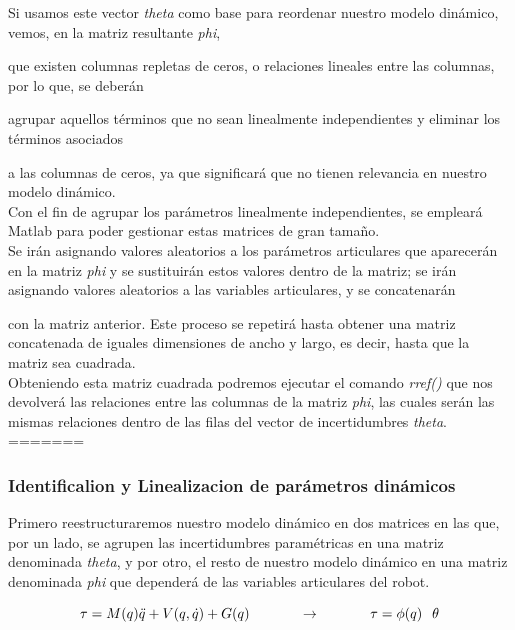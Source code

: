 Si usamos este vector \textit{theta} como base para reordenar nuestro modelo dinámico, vemos, en la matriz resultante \textit{phi},

que existen columnas repletas de ceros, o relaciones lineales entre las columnas, por lo que, se deberán

agrupar aquellos términos que no sean linealmente independientes y eliminar los términos asociados

a las columnas de ceros, ya que significará que no tienen relevancia en nuestro modelo dinámico.\\



Con el fin de agrupar los parámetros linealmente independientes, se empleará Matlab para poder gestionar estas matrices de gran tamaño.\\

Se irán asignando valores aleatorios a los parámetros articulares que aparecerán en la matriz \textit{phi} y se sustituirán estos valores dentro de la matriz; se irán asignando valores aleatorios a las variables articulares, y se concatenarán

con la matriz anterior. Este proceso se repetirá hasta obtener una matriz concatenada de iguales dimensiones de ancho y largo, es decir, hasta que la matriz sea cuadrada.\\



Obteniendo esta matriz cuadrada podremos ejecutar el comando \textit{rref()} que nos devolverá las relaciones entre las columnas de la matriz \textit{phi}, las cuales serán las mismas relaciones dentro de las filas del vector de incertidumbres \textit{theta}.\\


=======
	\subsubsection{Identificalion y Linealizacion de parámetros dinámicos}
		Primero reestructuraremos nuestro modelo dinámico en dos matrices en las que, por un lado,
		se agrupen las incertidumbres paramétricas en una matriz denominada \textit{theta}, y por otro, el resto de nuestro modelo
		dinámico en una matriz denominada \textit{phi} que dependerá de las variables articulares del robot.

		\begin{equation}
			\tau=M(q)\ddot{q}+V(q,\dot{q})+G(q) \hspace{1.25cm}  \rightarrow \hspace{1.25cm} \tau=\phi(q) \hspace{0.25cm} \theta
		\end{equation}


